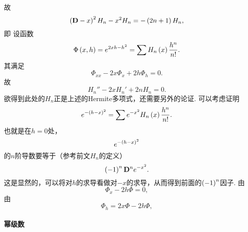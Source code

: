 \documentclass[UTF-8]{ctexart}
\begin{document}
  故
  \[ \left(\mathbf{D}-x\right)^2H_n-x^2H_n=-\left(2n+1\right)H_n, \]
  即
  设函数
  \[ \Phi\left(x,h\right) = e^{2xh-h^2} = \sum H_n\left(x\right)\frac{h^n}{n!}. \]
  其满足
  \[ \Phi_{xx} - 2x\Phi_x+2h\Phi_h = 0. \]
  故
  \[ H_n''-2xH_n'+2nH_n = 0. \]
  欲得到此处的$H_n$正是上述的Hermite多项式，还需要另外的论证. 可以考虑证明
  \[ e^{-\left(h-x\right)^2} = \sum e^{-x^2}H_n\left(x\right)\frac{h^n}{n!}. \]
  也就是在$h=0$处，
  \[ e^{-\left(h-x\right)^2} \]
  的$n$阶导数要等于（参考前文$H_n$的定义）
  \[ \left(-1\right)^n\mathbf{D}^n e^{-x^2}. \]
  这是显然的，可以将对$h$的求导看做对$-x$的求导，从而得到前面的$\left(-1\right)^n$因子.
  由
  \[ \Phi_x - 2h\Phi = 0, \]
  由
  \[ \Phi_h = 2x\Phi - 2h\Phi, \]
  \paragraph{幂级数}
\end{document}
